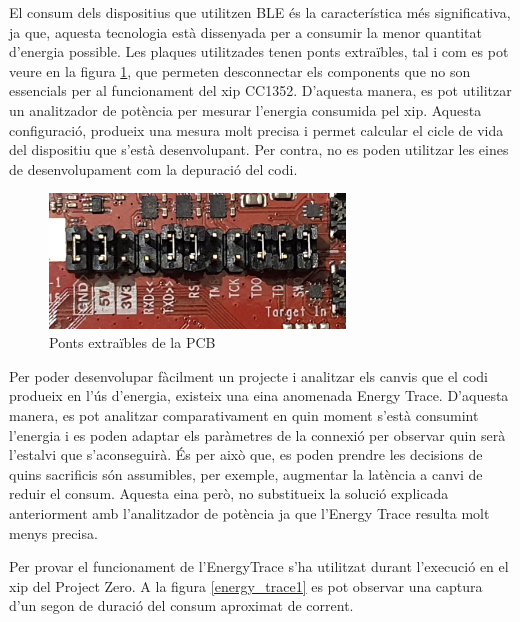 El consum dels dispositius que utilitzen BLE és la característica més significativa, ja que, aquesta tecnologia està dissenyada per a consumir la menor quantitat d'energia possible.
Les plaques utilitzades tenen ponts extraïbles, tal i com es pot veure en la figura \ref{ponts_extraibles}, que permeten desconnectar els components que no son essencials per al funcionament del xip CC1352.
D'aquesta manera, es pot utilitzar un analitzador de potència per mesurar l'energia consumida pel xip.
Aquesta configuració, produeix una mesura molt precisa i permet calcular el cicle de vida del dispositiu que s'està desenvolupant.
Per contra, no es poden utilitzar les eines de desenvolupament com la depuració del codi.


\begin{figure}[h]
	\begin{center}
		\includegraphics[width=0.7\textwidth]{./images/ponts.jpg}
		\caption{Ponts extraïbles de la PCB}
		\label{ponts_extraibles}
	\end{center}
\end{figure}

Per poder desenvolupar fàcilment un projecte i analitzar els canvis que el codi produeix en l'ús d'energia, existeix una eina anomenada Energy Trace.
D'aquesta manera, es pot analitzar comparativament en quin moment s'està consumint l'energia i es poden adaptar els paràmetres de la connexió per observar quin serà l'estalvi que s'aconseguirà.
És per això que, es poden prendre les decisions de quins sacrificis són assumibles, per exemple, augmentar la latència a canvi de reduir el consum.
Aquesta eina però, no substitueix la solució explicada anteriorment amb l'analitzador de potència ja que l'Energy Trace resulta molt menys precisa.

Per provar el funcionament de l'EnergyTrace s'ha utilitzat durant l'execució en el xip del Project Zero.
A la figura \ref{energy_trace1} es pot observar una captura d'un segon de duració del consum aproximat de corrent.

